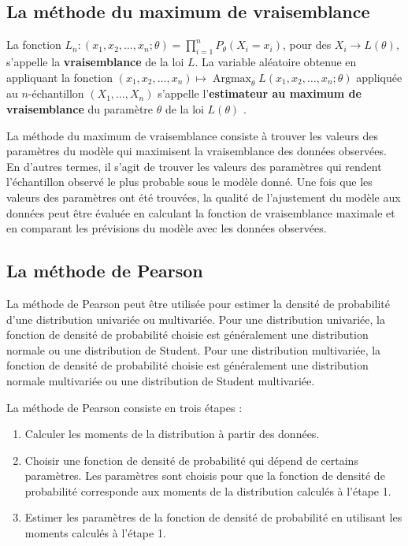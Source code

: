 \subsection{La méthode du maximum de vraisemblance}
\begin{Definition}
La fonction $L_n: (x_1, x_2, \dots, x_n; \theta) = \prod_{i=1}^n P_{\theta}(X_i = x_i)$, pour des $X_i \rightarrow L(\theta)$, s'appelle la \textbf{vraisemblance} de la loi $L$. La variable aléatoire obtenue en appliquant la fonction $(x_1, x_2, \dots, x_n) \mapsto \operatorname{Argmax}_{\theta}{L(x_1, x_2, \dots, x_n; \theta)}$ appliquée au $n$-échantillon $(X_1, \dots, X_n)$ s'appelle l'\textbf{estimateur au maximum de vraisemblance} du paramètre $\theta$ de la loi $L(\theta)$ \cite{casella2002statistical}.
\end{Definition}
La méthode du maximum de vraisemblance consiste à trouver les valeurs des paramètres du modèle qui maximisent la vraisemblance des données observées. En d'autres termes, il s'agit de trouver les valeurs des paramètres qui rendent l'échantillon observé le plus probable sous le modèle donné. Une fois que les valeurs des paramètres ont été trouvées, la qualité de l'ajustement du modèle aux données peut être évaluée en calculant la fonction de vraisemblance maximale et en comparant les prévisions du modèle avec les données observées.
\subsection{La méthode de Pearson}
La méthode de Pearson \cite{pearson1894contributions,su2021generalized} peut être utilisée pour estimer la densité de probabilité d'une distribution univariée ou multivariée. Pour une distribution univariée, la fonction de densité de probabilité choisie est généralement une distribution normale ou une distribution de Student. Pour une distribution multivariée, la fonction de densité de probabilité choisie est généralement une distribution normale multivariée ou une distribution de Student multivariée.

La méthode de Pearson consiste en trois étapes :
\begin{enumerate}
\item Calculer les moments de la distribution à partir des données.
\item Choisir une fonction de densité de probabilité qui dépend de certains paramètres. Les paramètres sont choisis pour que la fonction de densité de probabilité corresponde aux moments de la distribution calculés à l'étape 1.
\item Estimer les paramètres de la fonction de densité de probabilité en utilisant les moments calculés à l'étape 1.
\end{enumerate}

